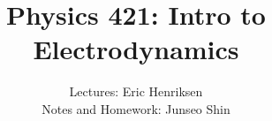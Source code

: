 \documentclass{article}
\author{Lectures: Eric Henriksen \\ Notes and Homework: Junseo Shin}
\date{}
\title{Physics 421: Intro to Electrodynamics}
\begin{document}
\maketitle
\tableofcontents
\pagebreak



\end{document}
